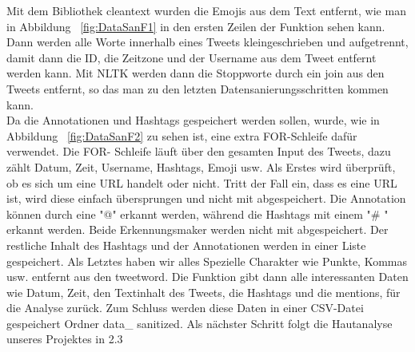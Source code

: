 
	Mit dem Bibliothek cleantext wurden die Emojis aus dem Text entfernt, wie man in Abbildung ~\ref{fig:DataSanF1} in den ersten Zeilen der Funktion sehen kann.
	Dann werden alle Worte innerhalb eines Tweets kleingeschrieben und aufgetrennt, damit dann die ID, die Zeitzone und der Username aus dem Tweet entfernt werden kann. Mit 
	NLTK werden dann die Stoppworte durch ein join aus den Tweets entfernt, so das man zu den letzten Datensanierungsschritten kommen kann.\\
	 
	
	Da die Annotationen und Hashtags gespeichert werden sollen, wurde, wie in Abbildung ~\ref{fig:DataSanF2} zu sehen ist,  eine extra FOR-Schleife dafür verwendet. Die FOR-
	Schleife läuft über den gesamten Input des Tweets, dazu zählt Datum, Zeit, Username, Hashtags, Emoji usw. Als Erstes wird überprüft, ob es sich um eine URL handelt oder 
	nicht. Tritt der Fall ein, dass es eine URL ist, wird diese einfach übersprungen und nicht mit abgespeichert. Die Annotation können durch eine "@" erkannt werden, während 
	die Hashtags mit einem "\# " erkannt werden. Beide Erkennungsmaker werden nicht mit abgespeichert. Der restliche Inhalt des Hashtags und der Annotationen werden in einer 
	Liste gespeichert. Als Letztes haben wir alles Spezielle Charakter wie Punkte, Kommas usw. entfernt aus den tweetword. Die Funktion gibt dann alle interessanten Daten wie 
	Datum, Zeit, den Textinhalt des Tweets, die Hashtags und die mentions, für die Analyse zurück. Zum Schluss werden diese Daten in einer CSV-Datei gespeichert Ordner data\_ 
	sanitized. Als nächster Schritt folgt die Hautanalyse unseres Projektes in 2.3
	
